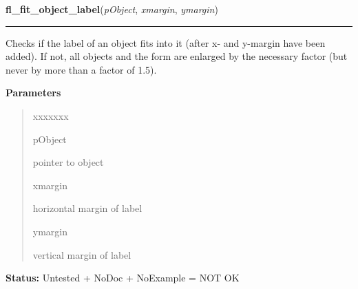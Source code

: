 \hspace{.8\funcindent}\begin{boxedminipage}{\funcwidth}

    \raggedright \textbf{fl\_fit\_object\_label}(\textit{pObject}, \textit{xmargin}, \textit{ymargin})

    \vspace{-1.5ex}

    \rule{\textwidth}{0.5\fboxrule}
\setlength{\parskip}{2ex}
    Checks if the label of an object fits into it (after x- and y-margin 
    have been added). If not, all objects and the form are enlarged by the 
    necessary factor (but never by more than a factor of 1.5).

\setlength{\parskip}{1ex}
      \textbf{Parameters}
      \vspace{-1ex}

      \begin{quote}
        \begin{Ventry}{xxxxxxx}

          \item[pObject]

          pointer to object

          \item[xmargin]

          horizontal margin of label

          \item[ymargin]

          vertical margin of label

        \end{Ventry}

      \end{quote}

\textbf{Status:} Untested + NoDoc + NoExample = NOT OK



    \end{boxedminipage}

    \label{xformslib:library:fl_get_object_geometry}

    \vspace{0.5ex}

